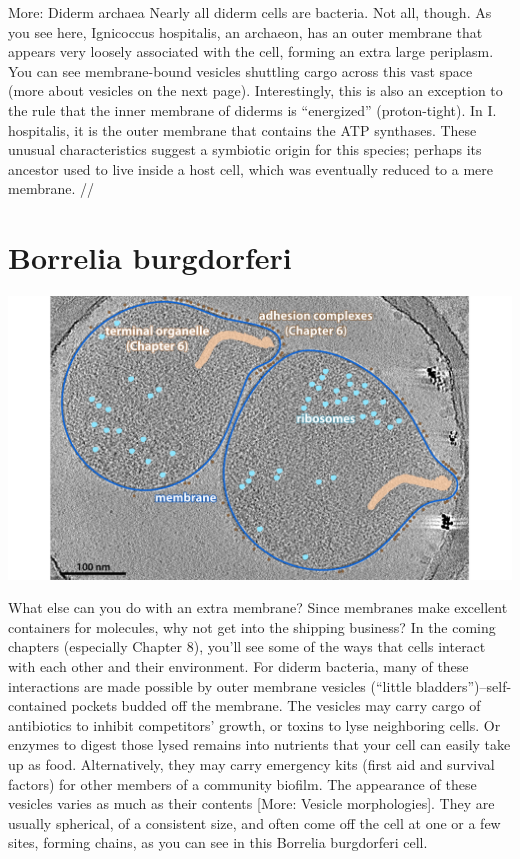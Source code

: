\documentclass[]{tufte-book}
\begin{document}
More: Diderm archaea Nearly all diderm cells are bacteria. Not all,
though. As you see here, Ignicoccus hospitalis, an archaeon, has an
outer membrane that appears very loosely associated with the cell,
forming an extra large periplasm. You can see membrane-bound vesicles
shuttling cargo across this vast space (more about vesicles on the next
page). Interestingly, this is also an exception to the rule that the
inner membrane of diderms is ``energized'' (proton-tight). In I.
hospitalis, it is the outer membrane that contains the ATP synthases.
These unusual characteristics suggest a symbiotic origin for this
species; perhaps its ancestor used to live inside a host cell, which was
eventually reduced to a mere membrane. //

\section{Borrelia burgdorferi}\label{borrelia-burgdorferi}

\includegraphics{img/02_static/2_1_Mgenitalium}

What else can you do with an extra membrane? Since membranes make
excellent containers for molecules, why not get into the shipping
business? In the coming chapters (especially Chapter 8), you'll see some
of the ways that cells interact with each other and their environment.
For diderm bacteria, many of these interactions are made possible by
outer membrane vesicles (``little bladders'')--self-contained pockets
budded off the membrane. The vesicles may carry cargo of antibiotics to
inhibit competitors' growth, or toxins to lyse neighboring cells. Or
enzymes to digest those lysed remains into nutrients that your cell can
easily take up as food. Alternatively, they may carry emergency kits
(first aid and survival factors) for other members of a community
biofilm. The appearance of these vesicles varies as much as their
contents {[}More: Vesicle morphologies{]}. They are usually spherical,
of a consistent size, and often come off the cell at one or a few sites,
forming chains, as you can see in this Borrelia burgdorferi cell.
\end{document}

